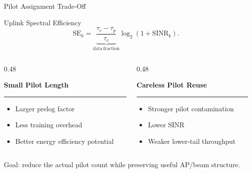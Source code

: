 \documentclass[aspectratio=169, 10pt]{beamer}
\newcommand{\slideheading}[1]{%
    \par\vspace{0.08cm}%
    \settowidth{\dimen0}{\bfseries\large #1}%
    {\bfseries\large #1}%
    \par\vspace{0.015cm}%
    {\color{black}\rule{\dimen0}{0.7pt}}%
    \par\vspace{0.16cm}%
}
\begin{document}
\begin{frame}{Pilot Assignment Trade-Off}
    \begin{block}{Uplink Spectral Efficiency}
        \[
        \mathrm{SE}_k =
        \underbrace{\frac{\tau_c-\tau_p}{\tau_c}}_{\mathrm{data\ fraction}}
        \log_2(1+\mathrm{SINR}_k).
        \]
    \end{block}

    \vspace{0.25cm}
    \begin{columns}[T,onlytextwidth]
        \begin{column}{0.48\textwidth}
            \slideheading{Small Pilot Length}
            \begin{itemize}
                \item Larger prelog factor
                \item Less training overhead
                \item Better energy efficiency potential
            \end{itemize}
        \end{column}
        \begin{column}{0.48\textwidth}
            \slideheading{Careless Pilot Reuse}
            \begin{itemize}
                \item Stronger pilot contamination
                \item Lower SINR
                \item Weaker lower-tail throughput
            \end{itemize}
        \end{column}
    \end{columns}

    \vspace{0.25cm}
    \alert{Goal: reduce the actual pilot count while preserving useful AP/beam structure.}
\end{frame}

\end{document}

